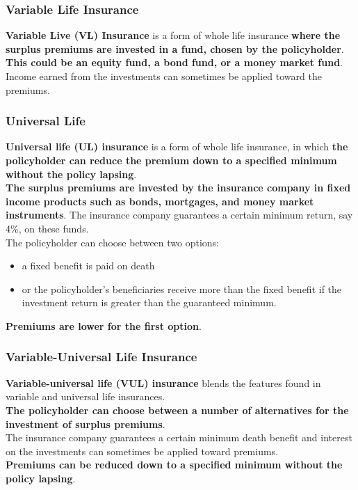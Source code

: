 \subsubsection{Variable Life Insurance}
\textbf{\color{blue}Variable Live (VL) Insurance} is a form of whole life insurance \textbf{\color{Mahogany}where the surplus premiums are invested in a fund, chosen by the policyholder}. \textbf{\color{ForestGreen}This could be an equity fund, a bond fund, or a money market fund}.\\
Income earned from the investments can sometimes be applied toward the premiums.

\subsubsection{Universal Life}
\textbf{\color{blue}Universal life (UL) insurance} is a form of whole life insurance, in which \textbf{\color{Mahogany}the policyholder can reduce the premium down to a specified minimum without the policy lapsing}.\\
\textbf{\color{ForestGreen}The surplus premiums are invested by the insurance company in fixed income products such as bonds, mortgages, and money market instruments}. The insurance company guarantees a certain minimum return, say 4\%, on these funds.\\
The policyholder can choose between two options:
\begin{itemize}
	\item a fixed benefit is paid on death
	\item or the policyholder's beneficiaries receive more than the fixed benefit if the investment return is greater than the guaranteed minimum.
\end{itemize}
\textbf{\color{Mahogany}Premiums are lower for the first option}.

\subsubsection{Variable-Universal Life Insurance}
\textbf{\color{blue}Variable-universal life (VUL) insurance} blends the features found in variable and universal life insurances.\\
\textbf{\color{Mahogany}The policyholder can choose between a number of alternatives for the investment of surplus premiums}.\\
The insurance company guarantees a certain minimum death benefit and interest on the investments can sometimes be applied toward premiums.\\
\textbf{\color{ForestGreen}Premiums can be reduced down to a specified minimum without the policy lapsing}.

